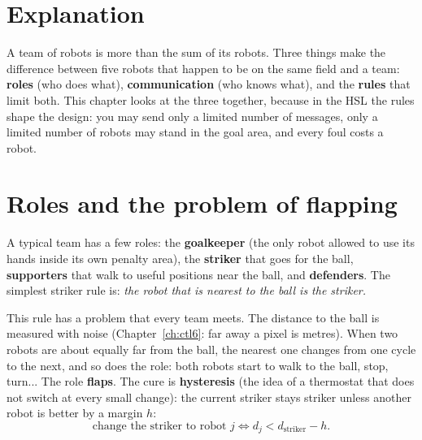 \label{ch:rc4}

\section*{Explanation}
A team of robots is more than the sum of its robots. Three things make the difference between five robots that happen to be on the same field and a team: \textbf{roles} (who does what), \textbf{communication} (who knows what), and the \textbf{rules} that limit both. This chapter looks at the three together, because in the HSL the rules shape the design: you may send only a limited number of messages, only a limited number of robots may stand in the goal area, and every foul costs a robot.

\section*{Roles and the problem of flapping}
A typical team has a few roles: the \textbf{goalkeeper} (the only robot allowed to use its hands inside its own penalty area), the \textbf{striker} that goes for the ball, \textbf{supporters} that walk to useful positions near the ball, and \textbf{defenders}. The simplest striker rule is: \emph{the robot that is nearest to the ball is the striker.}

This rule has a problem that every team meets. The distance to the ball is measured with noise (Chapter~\ref{ch:ctl6}: far away a pixel is metres). When two robots are about equally far from the ball, the nearest one changes from one cycle to the next, and so does the role: both robots start to walk to the ball, stop, turn... The role \textbf{flaps}. The cure is \textbf{hysteresis} (the idea of a thermostat that does not switch at every small change): the current striker stays striker unless another robot is better by a margin $h$:
\[
\text{change the striker to robot } j \iff d_j < d_{\text{striker}} - h .
\]

\begin{center}
\end{center}

